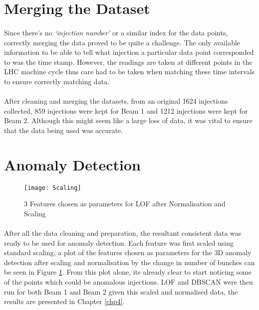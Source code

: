 \section{Merging the Dataset}
\label{sec::Merging_the_Dataset}
\paragraph{ }Since there's no \textit{`injection number'} or a similar index for the data points, correctly merging the data proved to be quite a challenge. The only available information to be able to tell what injection a particular data point corresponded to was the time stamp. However, the readings are taken at different points in the \acs{LHC} machine cycle thus care had to be taken when matching these time intervals to ensure correctly matching data.  

\paragraph{ }After cleaning and merging the datasets, from an original 1624 injections collected, 859 injections were kept for Beam 1 and 1212 injections were kept for Beam 2. Although this might seem like a large loss of data, it was vital to ensure that the data being used was accurate.

\section{Anomaly Detection}
\label{sec::AnomalyDetection}

\begin{figure}[t]
	\centering
	\texttt{[image: Scaling]}
	\caption[3D Features]{3 Features chosen as parameters for \acs{LOF} after Normalisation and Scaling}
	\label{fig::Scaling}
\end{figure}

\paragraph{ }After all the data cleaning and preparation, the resultant consistent data was ready to be used for anomaly detection. Each feature was first scaled using standard scaling, a plot of the features chosen as parameters for the 3D anomaly detection after scaling and normalisation by the change in number of bunches can be seen in Figure \ref{fig::Scaling}. From this plot alone, its already clear to start noticing some of the points which could be anomalous injections. \acs{LOF} and \acs{DBSCAN} were then run for both Beam 1 and Beam 2 given this scaled and normalised data, the results are presented in Chapter \ref{chp4}.

